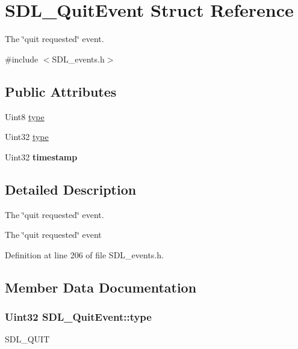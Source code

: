 \hypertarget{structSDL__QuitEvent}{\section{S\+D\+L\+\_\+\+Quit\+Event Struct Reference}
\label{structSDL__QuitEvent}
}


The \char`\"{}quit requested\char`\"{} event.  




{\ttfamily \#include $<$S\+D\+L\+\_\+events.\+h$>$}

\subsection*{Public Attributes}
\begin{DoxyCompactItemize}
\item 
Uint8 \hyperlink{structSDL__QuitEvent_a51ab0279e6de40249ba93971a8757cf0}{type}
\item 
Uint32 \hyperlink{structSDL__QuitEvent_a51ab0279e6de40249ba93971a8757cf0}{type}
\item 
\hypertarget{structSDL__QuitEvent_a7acd4fa42ca96da8edac146baaa0b433}{Uint32 {\bfseries timestamp}}\label{structSDL__QuitEvent_a7acd4fa42ca96da8edac146baaa0b433}

\end{DoxyCompactItemize}


\subsection{Detailed Description}
The \char`\"{}quit requested\char`\"{} event. 

The \char`\"{}quit requested\char`\"{} event 

Definition at line 206 of file S\+D\+L\+\_\+events.\+h.



\subsection{Member Data Documentation}
\hypertarget{structSDL__QuitEvent_a51ab0279e6de40249ba93971a8757cf0}{
\subsubsection[{type}]{\setlength{\rightskip}{0pt plus 5cm}Uint32 S\+D\+L\+\_\+\+Quit\+Event\+::type}}\label{structSDL__QuitEvent_a51ab0279e6de40249ba93971a8757cf0}
S\+D\+L\+\_\+\+Q\+U\+I\+T

